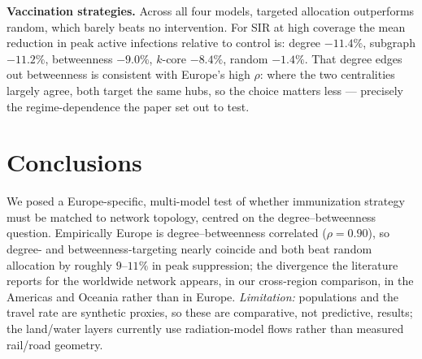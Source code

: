 \documentclass{sigkddExp}
\begin{document}
\textbf{Vaccination strategies.} Across all four models, targeted
allocation outperforms random, which barely beats no intervention. For SIR
at high coverage the mean reduction in peak active infections relative to
control is: degree $-11.4\%$, subgraph $-11.2\%$, betweenness $-9.0\%$,
$k$-core $-8.4\%$, random $-1.4\%$. That degree edges out betweenness is
consistent with Europe's high $\rho$: where the two centralities largely
agree, both target the same hubs, so the choice matters less --- precisely
the regime-dependence the paper set out to test.

\section{Conclusions}
We posed a Europe-specific, multi-model test of whether immunization
strategy must be matched to network topology, centred on the
degree--betweenness question. Empirically Europe is degree--betweenness
correlated ($\rho=0.90$), so degree- and betweenness-targeting nearly
coincide and both beat random allocation by roughly $9$--$11\%$ in peak
suppression; the divergence the literature reports for the worldwide
network appears, in our cross-region comparison, in the Americas and
Oceania rather than in Europe. \emph{Limitation:} populations and the
travel rate are synthetic proxies, so these are comparative, not
predictive, results; the land/water layers currently use radiation-model
flows rather than measured rail/road geometry.



\end{document}

